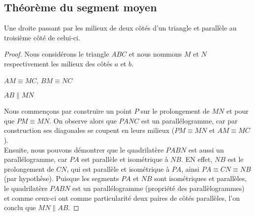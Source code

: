 \documentclass[a4paper,12pt]{article}
\begin{document}
\pagebreak
\subsection{Théorème du segment moyen}
\begin{theorem}
Une droite passant par les milieux de deux côtés d'un triangle et parallèle au troisième côté de celui-ci.
\end{theorem}

\begin{proof}
Nous considérons le triangle $ABC$ et nous nommons $M$ et $N$ respectivement les milieux des côtés $a$ et $b$. 

\begin{hyp}
$AM \equiv MC$, $BM \equiv NC$
\end{hyp}

\begin{concl}
$AB \parallel MN$
\end{concl}

Nous commençons par construire un point $P$ sur le prolongement de $MN$ et pour que $PM \equiv MN$. On observe alors que $PANC$ est un parallélogramme, car par construction ses diagonales se coupent en leurs milieux ($PM \equiv MN$ et $AM \equiv MC$).\\
Ensuite, nous pouvons démontrer que le quadrilatère $PABN$ est aussi un parallélogramme, car $PA$ est parallèle et isométrique à $NB$. EN effet, $NB$ est le prolongement de $CN$, qui est parallèle et isométrique à $PA$, ainsi $PA \equiv CN \equiv NB$ (par hypothèse). Puisque les segments $PA$ et $NB$ sont isométriques et parallèles, le quadrilatère $PABN$ est un parallélogramme (propriété des parallèlogrammes) et comme ceux-ci ont comme particularité deux paires de côtés parallèles, l'on conclu que $MN \parallel AB$.


\end{proof}
\end{document}
